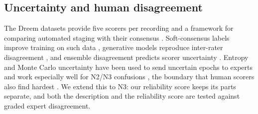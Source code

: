 \subsection{Uncertainty and human disagreement}
The Dreem datasets provide five scorers per recording and a framework for comparing automated staging with their consensus \cite{guillot2020dod}. Soft-consensus labels improve training on such data \cite{fiorillo2023multiscored}, generative models reproduce inter-rater disagreement \cite{vangorp2023uflow}, and ensemble disagreement predicts scorer uncertainty \cite{dei2025sleepyland}. Entropy and Monte Carlo uncertainty have been used to send uncertain epochs to experts \cite{phan2022sleeptransformer,heremans2024upass} and work especially well for N2/N3 confusions \cite{vainikka2026uncertainty}, the boundary that human scorers also find hardest \cite{rosenberg2013interscorer}. We extend this to N3: our reliability score keeps its parts separate, and both the description and the reliability score are tested against graded expert disagreement.

